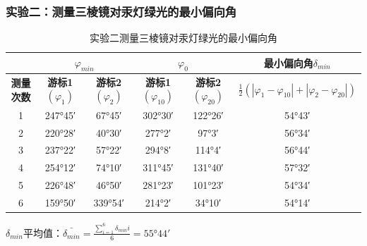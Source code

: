 \documentclass[]{../../templates/Report}%
\begin{document}
\begin{fullreportonly}
\subsubsection{实验二：测量三棱镜对汞灯绿光的最小偏向角}
\begin{table}[H]
    \centering
    \caption{实验二测量三棱镜对汞灯绿光的最小偏向角}
    \begin{tabular}{|c|c|c|c|c|c|}
        \hline
         & 
        \multicolumn{2}{|c|}{\textbf{$\varphi_{min}$}} &
        \multicolumn{2}{|c|}{\textbf{$\varphi_{0}$}} &
        \textbf{最小偏向角$\delta_{min}$}  \\
        \hline
        \textbf{测量次数} & \textbf{游标1$(\varphi _1)$} & \textbf{游标2$(\varphi _2)$} & \textbf{游标1$(\varphi_{10})$} & \textbf{游标2$(\varphi_{20})$} & \textbf{$\frac{1}{2}(|\varphi_1 - \varphi_{10}| + |\varphi_2 - \varphi_{20}|)$}  \\
        \hline
        1 & \ang{247;45} & \ang{67;45} & \ang{302;30} & \ang{122;26} & \ang{54;43}  \\
        \hline
        2 & \ang{220;28} & \ang{40;30} & \ang{277;2} & \ang{97;3} & \ang{56;34}  \\
        \hline
        3 & \ang{237;22} & \ang{57;22} & \ang{294;8} & \ang{114;4} & \ang{56;44}  \\
        \hline
        4 & \ang{254;12} & \ang{74;10} & \ang{311;45} & \ang{131;40} & \ang{57;32}  \\
        \hline
        5 & \ang{226;48} & \ang{46;50} & \ang{281;23} & \ang{101;23} & \ang{54;34}  \\
        \hline
        6 & \ang{159;50} & \ang{339;54} & \ang{214;2} & \ang{34;10} & \ang{54;14}  \\
        \hline
    \end{tabular}
\end{table}
$\delta_{min}$平均值：$\bar{\delta_{min}} = \frac{\displaystyle\sum_{i=1}^6 \delta_{min}i}{6} = \ang{55;44}$



\end{fullreportonly}
\end{document}
